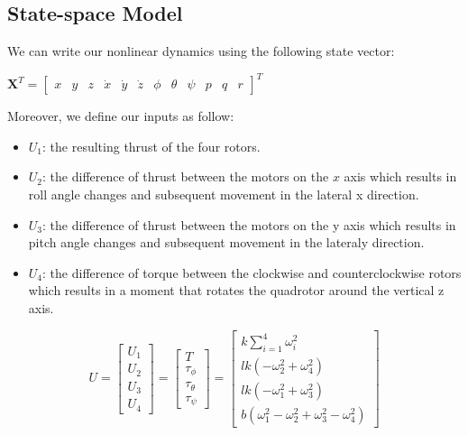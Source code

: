 \subsection{State-space Model}

We can write our nonlinear dynamics using the following state vector:

$\boldsymbol{X}^{T}=\left[\begin{array}{cccccccccccc}{x} & {y} & {z} & {\dot{x}} & {\dot{y}} & {\dot{z}} & {\phi} & {\theta} & {\psi} & {p} & {q} & {r}\end{array}\right]^{T}$

Moreover, we define our inputs as follow:
\begin{itemize}
  \item $U_1$: the resulting thrust of the four rotors.
  \item $U_2$: the difference of thrust between the motors on the $x$ axis which results in roll angle changes and subsequent movement in the lateral x direction.
  \item $U_3$: the difference of thrust between the motors on the y axis which results in pitch
  angle changes and subsequent movement in the lateraly direction.
  \item $U_4$: the difference of torque between the clockwise and counterclockwise rotors which
  results in a moment that rotates the quadrotor around the vertical z axis.
\end{itemize}

$$U=\left[ \begin{array}{l}{U_{1}} \\ {U_{2}} \\ {U_{3}} \\ {U_{4}}\end{array}\right]= \left[ \begin{array}{c}{T} \\ {\tau_{\phi}} \\ {\tau_{\theta}} \\ {\tau_{\psi}}\end{array}\right]=
\left[ \begin{array}{c}
{k \sum_{i=1}^{4} \omega_{i}^{2}} \\
{l k\left(-\omega_{2}^{2}+\omega_{4}^{2}\right)} \\ 
{l k\left(-\omega_{1}^{2}+\omega_{3}^{2}\right)} \\ 
{b(\omega_{1}^{2}-\omega_{2}^{2}+\omega_{3}^{2}-\omega_{4}^{2})}\end{array}\right]
$$

